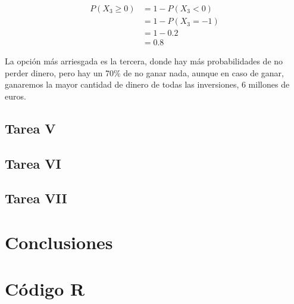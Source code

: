 \documentclass[12pt,a4paper,twoside,openright,titlepage,final]{article}
\begin{document}
\begin{align*}
P(X_3 \geq 0) & = 1 - P(X_3 < 0) \\ & = 1 - P(X_3 = -1) \\ & = 1 - 0.2 \\ & = 0.8 
\end{align*}

La opción más arriesgada es la tercera, donde hay más probabilidades de no perder dinero, pero hay un 70\% de no ganar nada, aunque en caso de ganar, ganaremos la mayor cantidad de dinero de todas las inversiones, 6 millones de euros.\\

 

\subsection{Tarea V}



\subsection{Tarea VI}


\subsection{Tarea VII}

\section{Conclusiones}
   

\newpage

\section{Código R}


\end{document}
